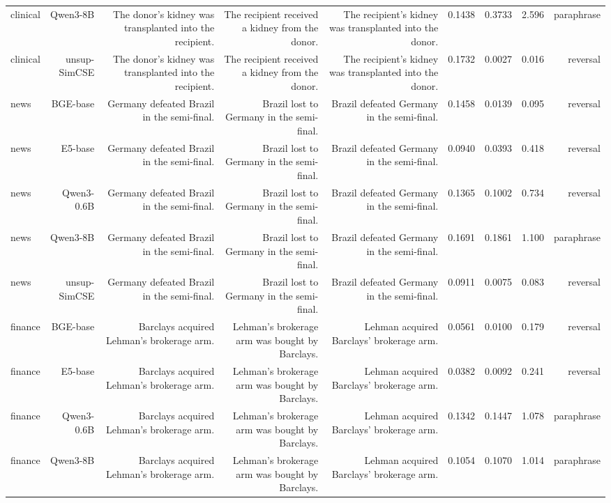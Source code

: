 \begin{table}[t]
\begin{tabular}{lrrrrrrrr}
clinical & Qwen3-8B & The donor's kidney was transplanted into the recipient. & The recipient received a kidney from the donor. & The recipient's kidney was transplanted into the donor. & 0.1438 & 0.3733 & 2.596 & paraphrase \\
clinical & unsup-SimCSE & The donor's kidney was transplanted into the recipient. & The recipient received a kidney from the donor. & The recipient's kidney was transplanted into the donor. & 0.1732 & 0.0027 & 0.016 & reversal \\
news & BGE-base & Germany defeated Brazil in the semi-final. & Brazil lost to Germany in the semi-final. & Brazil defeated Germany in the semi-final. & 0.1458 & 0.0139 & 0.095 & reversal \\
news & E5-base & Germany defeated Brazil in the semi-final. & Brazil lost to Germany in the semi-final. & Brazil defeated Germany in the semi-final. & 0.0940 & 0.0393 & 0.418 & reversal \\
news & Qwen3-0.6B & Germany defeated Brazil in the semi-final. & Brazil lost to Germany in the semi-final. & Brazil defeated Germany in the semi-final. & 0.1365 & 0.1002 & 0.734 & reversal \\
news & Qwen3-8B & Germany defeated Brazil in the semi-final. & Brazil lost to Germany in the semi-final. & Brazil defeated Germany in the semi-final. & 0.1691 & 0.1861 & 1.100 & paraphrase \\
news & unsup-SimCSE & Germany defeated Brazil in the semi-final. & Brazil lost to Germany in the semi-final. & Brazil defeated Germany in the semi-final. & 0.0911 & 0.0075 & 0.083 & reversal \\
finance & BGE-base & Barclays acquired Lehman's brokerage arm. & Lehman's brokerage arm was bought by Barclays. & Lehman acquired Barclays' brokerage arm. & 0.0561 & 0.0100 & 0.179 & reversal \\
finance & E5-base & Barclays acquired Lehman's brokerage arm. & Lehman's brokerage arm was bought by Barclays. & Lehman acquired Barclays' brokerage arm. & 0.0382 & 0.0092 & 0.241 & reversal \\
finance & Qwen3-0.6B & Barclays acquired Lehman's brokerage arm. & Lehman's brokerage arm was bought by Barclays. & Lehman acquired Barclays' brokerage arm. & 0.1342 & 0.1447 & 1.078 & paraphrase \\
finance & Qwen3-8B & Barclays acquired Lehman's brokerage arm. & Lehman's brokerage arm was bought by Barclays. & Lehman acquired Barclays' brokerage arm. & 0.1054 & 0.1070 & 1.014 & paraphrase \\

\end{tabular}
\end{table}
